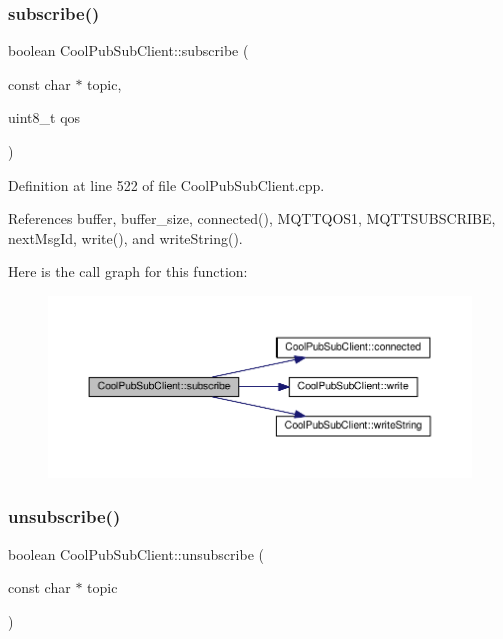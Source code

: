 \subsubsection{\texorpdfstring{subscribe()}{subscribe()}\hspace{0.1cm}{\footnotesize\ttfamily [2/2]}}
{\footnotesize\ttfamily boolean Cool\+Pub\+Sub\+Client\+::subscribe (\begin{DoxyParamCaption}\item[{const char $\ast$}]{topic,  }\item[{uint8\+\_\+t}]{qos }\end{DoxyParamCaption})}



Definition at line 522 of file Cool\+Pub\+Sub\+Client.\+cpp.



References buffer, buffer\+\_\+size, connected(), M\+Q\+T\+T\+Q\+O\+S1, M\+Q\+T\+T\+S\+U\+B\+S\+C\+R\+I\+BE, next\+Msg\+Id, write(), and write\+String().

Here is the call graph for this function\+:\nopagebreak
\begin{figure}[H]
\begin{center}
\leavevmode
\includegraphics[width=350pt]{d8/d4b/class_cool_pub_sub_client_aebf684e98588c52a72af1014f7957bee_cgraph}
\end{center}
\end{figure}
\mbox{\label{class_cool_pub_sub_client_a850554280e314d6b5c33c73fd9e809fc}} 
\subsubsection{\texorpdfstring{unsubscribe()}{unsubscribe()}}
{\footnotesize\ttfamily boolean Cool\+Pub\+Sub\+Client\+::unsubscribe (\begin{DoxyParamCaption}\item[{const char $\ast$}]{topic }\end{DoxyParamCaption})}



